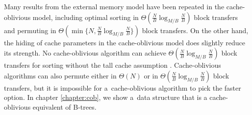 Many results from the external memory model have been repeated in the
cache-oblivious model, including optimal sorting in
$\Theta(\frac{N}{B}\log_{M/B}\frac{N}{B})$ block transfers and permuting
in $\Theta(\min\{N,\frac{N}{B}\log_{M/B}\frac{N}{B}\})$ block transfers.
On the other hand, the hiding of cache parameters in the cache-oblivious model
does slightly reduce its strength. No cache-oblivious algorithm can achieve
$\Theta(\frac{N}{B}\log_{M/B}\frac{N}{B})$ block transfers for sorting
without the tall cache assumption \cite{limits-of-co}. Cache-oblivious
algorithms can also permute either in $\Theta(N)$ or in
$\Theta(\frac{N}{B}\log_{M/B}\frac{N}{B})$ block transfers, but it is
impossible for a~cache-oblivious algorithm to pick the faster option.
In chapter \ref{chapter:cob}, we show a~data structure that is a
cache-oblivious equivalent of B-trees.
